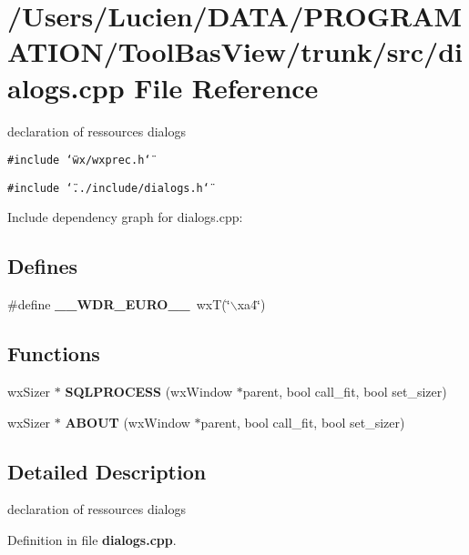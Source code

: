 \section{/Users/Lucien/DATA/PROGRAMATION/Tool\-Bas\-View/trunk/src/dialogs.cpp File Reference}
\label{dialogs_8cpp}
declaration of ressources dialogs 

{\tt \#include \char`\"{}wx/wxprec.h\char`\"{}}\par
{\tt \#include \char`\"{}../include/dialogs.h\char`\"{}}\par


Include dependency graph for dialogs.cpp:\subsection*{Defines}
\begin{CompactItemize}
\item 
\#define {\bf \_\-\_\-WDR\_\-EURO\_\-\_\-}~wx\-T(\char`\"{}$\backslash$xa4\char`\"{})\label{dialogs_8cpp_f408cff180855c38453577d0e4c60c4c}

\end{CompactItemize}
\subsection*{Functions}
\begin{CompactItemize}
\item 
wx\-Sizer $\ast$ {\bf SQLPROCESS} (wx\-Window $\ast$parent, bool call\_\-fit, bool set\_\-sizer)\label{dialogs_8cpp_f325d28893102c40d4456a1f4f03b8ba}

\item 
wx\-Sizer $\ast$ {\bf ABOUT} (wx\-Window $\ast$parent, bool call\_\-fit, bool set\_\-sizer)\label{dialogs_8cpp_d57509f119e792a1d6fe27678a4d5100}

\end{CompactItemize}


\subsection{Detailed Description}
declaration of ressources dialogs 



Definition in file {\bf dialogs.cpp}.